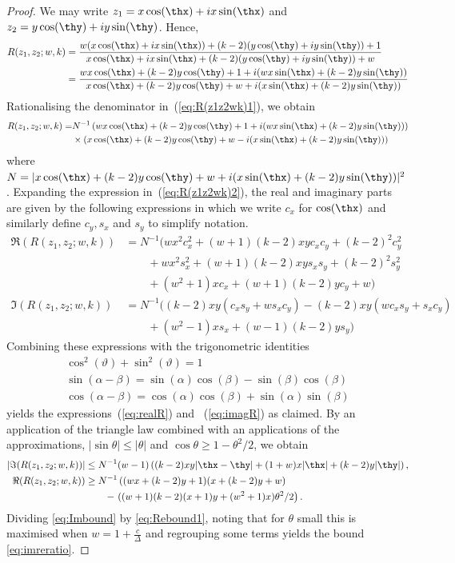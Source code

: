 \begin{proof}
 We may write $z_1 = x\cos(\thx) +ix\sin(\thx)$ and $z_2 = y\cos(\thy) +iy\sin(\thy)$. Hence,
 \begin{align}
  \nonumber R(z_1,z_2;w,k) & = \frac{w(x\cos(\thx) +ix\sin(\thx)) +(k-2)(y\cos(\thy) +iy\sin(\thy)) +1}{x\cos(\thx) +ix\sin(\thx) +(k-2)(y\cos(\thy) +iy\sin(\thy)) +w} \\
  & = \frac{wx\cos(\thx) +(k-2)y\cos(\thy) +1 + i(wx\sin(\thx) + (k-2)y\sin(\thy))}{x\cos(\thx) +(k-2)y\cos(\thy) +w + i(x\sin(\thx) + (k-2)y\sin(\thy))} \label{eq:R(z1z2wk)1}
 \end{align}
Rationalising the denominator in~(\ref{eq:R(z1z2wk)1}), we obtain
\begin{align}
 \nonumber R(z_1,z_2;w,k) = & N^{-1}\left(wx\cos(\thx) +(k-2)y\cos(\thy) +1 + i(wx\sin(\thx) + (k-2)y\sin(\thy))\right)\\
 & \times \left(x\cos(\thx) +(k-2)y\cos(\thy) +w - i(x\sin(\thx) + (k-2)y\sin(\thy))\right) \label{eq:R(z1z2wk)2}
\end{align}
where $N = |x\cos(\thx) +(k-2)y\cos(\thy) +w + i(x\sin(\thx) + (k-2)y\sin(\thy))|^2$.
Expanding the expression in~(\ref{eq:R(z1z2wk)2}), the real and imaginary parts are given by the following expressions in which we write $c_x$ for $\cos(\thx)$ and similarly define $c_y,s_x$ and $s_y$ to simplify notation.
 \begin{align*}
  \Re(R(z_1,z_2;w,k)) &= N^{-1}(wx^2c_x^2+(w+1)(k-2)xyc_xc_y+(k-2)^2c_y^2 \\
  &\qquad + wx^2s_x^2 + (w+1)(k-2)xys_xs_y+(k-2)^2s_y^2\\
  &\qquad +(w^2+1)xc_x+(w+1)(k-2)yc_y+w)\\
  \Im(R(z_1,z_2;w,k)) &= N^{-1}((k-2)xy(c_xs_y+ws_xc_y) - (k-2)xy(wc_xs_y+s_xc_y)\\
  &\qquad + (w^2-1)xs_x+(w-1)(k-2)ys_y )
 \end{align*}
Combining these expressions with the trigonometric identities
\begin{gather*}
 \cos^2(\vartheta)+\sin^2(\vartheta) = 1 \\
 \sin(\alpha-\beta) = \sin(\alpha)\cos(\beta)-\sin(\beta)\cos(\beta) \\
 \cos(\alpha-\beta) = \cos(\alpha)\cos(\beta)+\sin(\alpha)\sin(\beta)
\end{gather*}
yields the expressions~(\ref{eq:realR}) and ~(\ref{eq:imagR}) as claimed.
%
By an application of the triangle law combined with an applications of the approximations, $|\sin\theta| \leq |\theta|$ and $\cos\theta \geq 1-\theta^2/2$, we obtain
\begin{align}
 |\Im(R(z_1,z_2;w,k))| &\leq N^{-1} (w-1)\left((k-2)xy|\thx-\thy|+(1+w)x|\thx|+(k-2)y|\thy|\right), \label{eq:Imbound} \\
 \Re(R(z_1,z_2;w,k)) &\geq N^{-1} \left((wx+(k-2)y+1)(x+(k-2)y+w) \right.\nonumber\\ 
&\qquad -\left. ((w+1)(k-2)(x+1)y+(w^2+1)x)\theta^2/2\right). \label{eq:Rebound1}
\end{align}
Dividing \eqref{eq:Imbound} by \eqref{eq:Rebound1}, noting that for $\theta$ small this is maximised when $w = 1+\frac{c}{\Delta}$ and regrouping some terms yields the bound \eqref{eq:imreratio}.
%
%
%
%
%
\end{proof}
